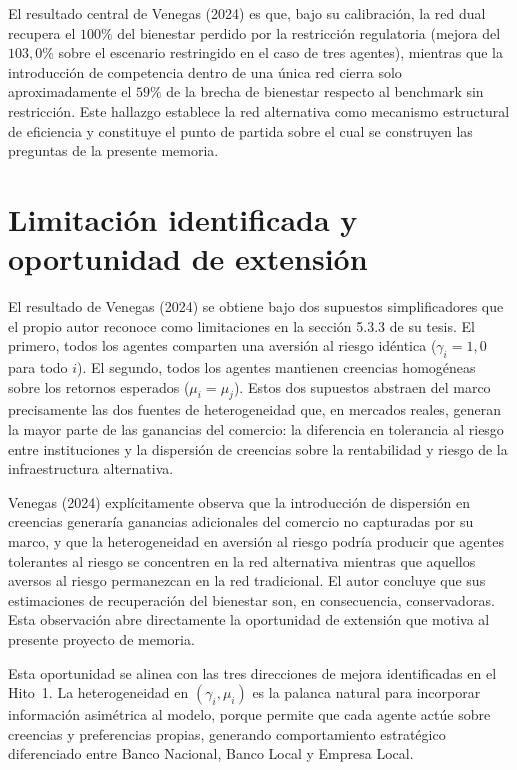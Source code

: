 \documentclass[12pt,a4paper]{article}
\begin{document}
El resultado central de Venegas (2024) es que, bajo su calibración, la red dual recupera el
$100\%$ del bienestar perdido por la restricción regulatoria (mejora del $103{,}0\%$ sobre el
escenario restringido en el caso de tres agentes), mientras que la introducción de competencia
dentro de una única red cierra solo aproximadamente el $59\%$ de la brecha de bienestar
respecto al benchmark sin restricción. Este hallazgo establece la red alternativa como
mecanismo estructural de eficiencia y constituye el punto de partida sobre el cual se
construyen las preguntas de la presente memoria.

\section{Limitación identificada y oportunidad de extensión}

El resultado de Venegas (2024) se obtiene bajo dos supuestos simplificadores que el propio
autor reconoce como limitaciones en la sección 5.3.3 de su tesis. El primero, todos los agentes
comparten una aversión al riesgo idéntica ($\gamma_i = 1{,}0$ para todo $i$). El segundo, todos
los agentes mantienen creencias homogéneas sobre los retornos esperados ($\mu_i = \mu_j$).
Estos dos supuestos abstraen del marco precisamente las dos fuentes de heterogeneidad que,
en mercados reales, generan la mayor parte de las ganancias del comercio: la diferencia en
tolerancia al riesgo entre instituciones y la dispersión de creencias sobre la rentabilidad y
riesgo de la infraestructura alternativa.

Venegas (2024) explícitamente observa que la introducción de dispersión en creencias generaría
ganancias adicionales del comercio no capturadas por su marco, y que la heterogeneidad en
aversión al riesgo podría producir que agentes tolerantes al riesgo se concentren en la red
alternativa mientras que aquellos aversos al riesgo permanezcan en la red tradicional. El autor
concluye que sus estimaciones de recuperación del bienestar son, en consecuencia,
conservadoras. Esta observación abre directamente la oportunidad de extensión que motiva al
presente proyecto de memoria.

Esta oportunidad se alinea con las tres direcciones de mejora identificadas en el Hito~1. La
heterogeneidad en $(\gamma_i, \mu_i)$ es la palanca natural para incorporar información
asimétrica al modelo, porque permite que cada agente actúe sobre creencias y preferencias
propias, generando comportamiento estratégico diferenciado entre Banco Nacional, Banco
Local y Empresa Local.
\end{document}

